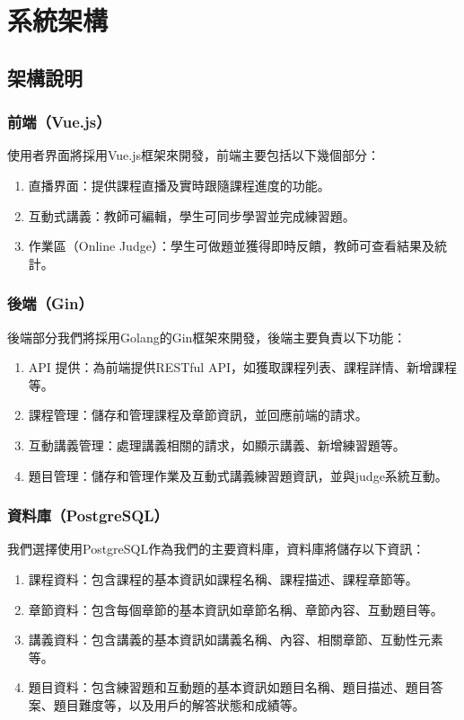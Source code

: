 \documentclass[12pt]{article}
\begin{document}
  
\section{系統架構}

\subsection{架構說明}

\subsubsection{前端（Vue.js）}
使用者界面將採用Vue.js框架來開發，前端主要包括以下幾個部分：

\begin{enumerate}[label=\textbullet, noitemsep]
  \item 直播界面：提供課程直播及實時跟隨課程進度的功能。
  \item 互動式講義：教師可編輯，學生可同步學習並完成練習題。
  \item 作業區（Online Judge）：學生可做題並獲得即時反饋，教師可查看結果及統計。
\end{enumerate}

\subsubsection{後端（Gin）}
後端部分我們將採用Golang的Gin框架來開發，後端主要負責以下功能：

\begin{enumerate}[label=\textbullet, noitemsep]
  \item API 提供：為前端提供RESTful API，如獲取課程列表、課程詳情、新增課程等。
  \item 課程管理：儲存和管理課程及章節資訊，並回應前端的請求。
  \item 互動講義管理：處理講義相關的請求，如顯示講義、新增練習題等。
  \item 題目管理：儲存和管理作業及互動式講義練習題資訊，並與judge系統互動。
\end{enumerate}

\subsubsection{資料庫（PostgreSQL）}
我們選擇使用PostgreSQL作為我們的主要資料庫，資料庫將儲存以下資訊：

\begin{enumerate}[label=\textbullet, noitemsep]
  \item 課程資料：包含課程的基本資訊如課程名稱、課程描述、課程章節等。
  \item 章節資料：包含每個章節的基本資訊如章節名稱、章節內容、互動題目等。
  \item 講義資料：包含講義的基本資訊如講義名稱、內容、相關章節、互動性元素等。
  \item 題目資料：包含練習題和互動題的基本資訊如題目名稱、題目描述、題目答案、題目難度等，以及用戶的解答狀態和成績等。
\end{enumerate}
\end{document}
